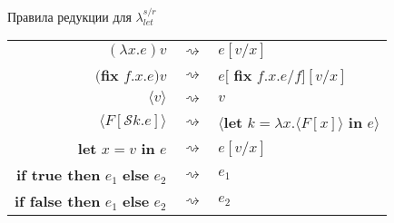 \documentclass{beamer}
\begin{document}
\begin{frame}[fragile]{Правила редукции для $\lambda_{let}^{s/r}$}
\begin{tabular}{ r  c  l }
$(\lambda x.e) v$ & $\rightsquigarrow$ & $e[v/x]$ \\
$($\textbf{fix} $ f.x.e) v$ & $\rightsquigarrow$ & $e[$ \textbf{fix} $ f.x.e/f][v/x]$ \\
$\langle v\rangle$ & $\rightsquigarrow$ & $v$ \\
$\langle F[\mathcal{S}k.e]\rangle$ & $\rightsquigarrow$ & $\langle$\textbf{let} $k = \lambda x.\langle F[x]\rangle$ \textbf{in} $e\rangle$ \\
\textbf{let} $x = v$ \textbf{in} $e$ & $\rightsquigarrow$ & $e[v/x]$ \\
\textbf{if true  then} $e_1$ \textbf{else} $e_2$ & $\rightsquigarrow$ & $e_1$ \\
\textbf{if false then} $e_1$ \textbf{else} $e_2$ & $\rightsquigarrow$ & $e_2$ \\
\end{tabular}
\end{frame}
\end{document}
